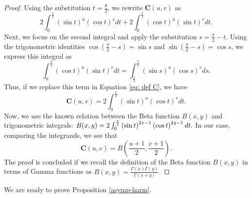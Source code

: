 \documentclass[12pt]{amsart}
\numberwithin{subsection}{section}
\theoremstyle{definition}
\theoremstyle{remark}
\begin{document}
\begin{proof}
Using the substitution $t = \frac{\theta}{2}$, we rewrite $\boldsymbol{C}(u,v)$ as
\begin{equation} \label{eq: def C}
2 \int_{0}^{\frac{\pi}{4}} \left( \sin t \right)^u \left( \cos t \right)^v dt + 2 \int_{0}^{\frac{\pi}{4}} \left( \cos t \right)^u \left( \sin t \right)^v dt.
\end{equation}
Next, we focus on the second integral and apply the substitution $s = \frac{\pi}{2} - t$. Using the trigonometric identities $\cos\left(\frac{\pi}{2} - s\right) = \sin s$ and $\sin\left(\frac{\pi}{2} - s\right) = \cos s$, we express this integral as
\[
\int_{0}^{\frac{\pi}{4}} \left( \cos t \right)^u \left( \sin t \right)^v dt = \int_{\frac{\pi}{4}}^{\frac{\pi}{2}} \left( \sin s \right)^u \left( \cos s \right)^v ds.
\]
Thus, if we replace this term in Equation \eqref{eq: def C}, we have
\[
\boldsymbol{C}(u,v) = 2 \int_{0}^{\frac{\pi}{2}} \left( \sin t \right)^u \left( \cos t \right)^v dt.
\]
Now, we use the known relation between the Beta function $B(x,y)$ and trigonometric integrals: $
B(x,y)  \linebreak = 2 \int_{0}^{\frac{\pi}{2}} \left( \sin t \right)^{2x-1} \left( \cos t \right)^{2y-1} dt.$
In our case, comparing the integrands, we see that$$
\boldsymbol{C}(u,v) = B\left(\frac{u+1}{2}, \frac{v+1}{2}\right).$$
The proof is concluded if we recall the definition of the Beta function $B(x, y)$ in terms of Gamma functions as $
B(x, y) = \frac{\Gamma(x) \Gamma(y)}{\Gamma(x + y)}.$
\end{proof}



We are ready to prove Proposition \ref{asymp-harm}.
\end{document}
